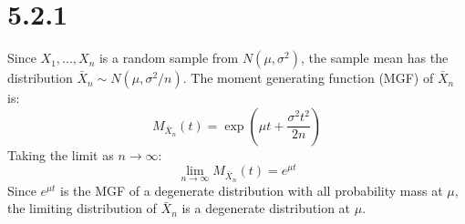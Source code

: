\documentclass{article}
\begin{document}
\section*{5.2.1}
Since $X_1, ..., X_n$ is a random sample from $N(\mu, \sigma^2)$, 
the sample mean has the distribution $\bar{X}_n \sim N(\mu, \sigma^2/n)$.
The moment generating function (MGF) of $\bar{X}_n$ is:
$$
M_{\bar{X}_n}(t) = \exp\left(\mu t + \frac{\sigma^2 t^2}{2n}\right)
$$
Taking the limit as $n \to \infty$:
$$
\lim_{n \to \infty} M_{\bar{X}_n}(t) = e^{\mu t}
$$
Since $e^{\mu t}$ is the MGF of a degenerate distribution with all probability mass at $\mu$, 
the limiting distribution of $\bar{X}_n$ is a degenerate distribution at $\mu$.
\end{document}
